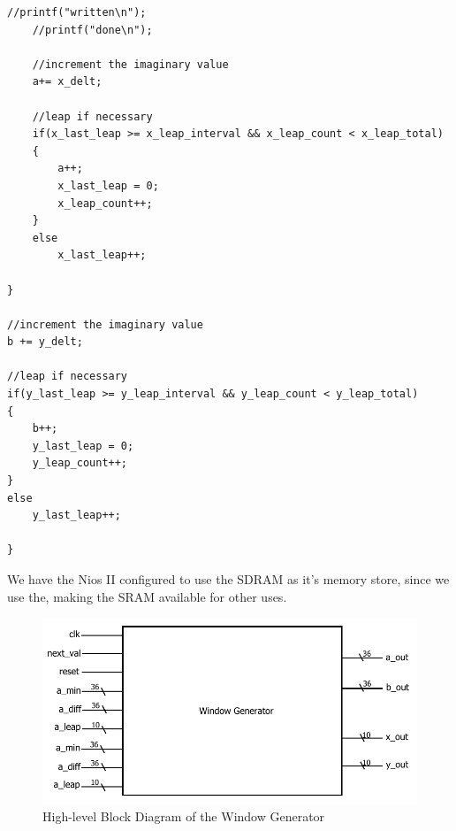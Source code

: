 \documentclass{article}
\begin{document}
\begin{lstlisting}[caption="Window Generation Procedure"]
    //printf("written\n");
    //printf("done\n");           
   
    //increment the imaginary value
    a+= x_delt;           
   
    //leap if necessary
    if(x_last_leap >= x_leap_interval && x_leap_count < x_leap_total)
    {
        a++;
        x_last_leap = 0;
        x_leap_count++;
    }
    else
        x_last_leap++;          
   
}

//increment the imaginary value
b += y_delt;

//leap if necessary
if(y_last_leap >= y_leap_interval && y_leap_count < y_leap_total)
{
    b++;
    y_last_leap = 0;
    y_leap_count++;
}
else
    y_last_leap++;

}
\end{lstlisting}

We have the Nios II configured to use the SDRAM as it's memory store,
since we use the, making the SRAM available for other uses.


\begin{figure}[h!]
  \centering
    \includegraphics[width=\textwidth]{block_diagrams/win_gen.pdf}
  \caption{High-level Block Diagram of the Window Generator}
\end{figure}
\end{document}
